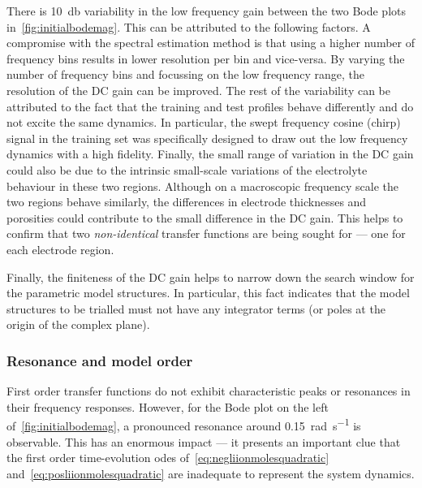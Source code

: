 There is \approx\SI{10}{\decibel} variability in  the low frequency gain between
the two Bode  plots in~\cref{fig:initialbodemag}. This can be  attributed to the
following  factors. A  compromise with  the spectral  estimation method  is that
using a higher number of frequency bins  results in lower resolution per bin and
vice-versa. By  varying the number  of frequency bins  and focussing on  the low
frequency range, the resolution of the DC  gain can be improved. The rest of the
variability can  be attributed to the  fact that the training  and test profiles
behave differently and do not excite the same dynamics. In particular, the swept
frequency cosine (chirp) signal in the training set was specifically designed to
draw out  the low frequency  dynamics with a  high fidelity. Finally,  the small
range of variation in the DC gain could also be due to the intrinsic small-scale
variations of  the electrolyte  behaviour in  these two  regions. Although  on a
macroscopic frequency scale the two regions behave similarly, the differences in
electrode thicknesses and porosities could contribute to the small difference in
the  DC gain.  This  helps  to confirm  that  two \emph{non-identical}  transfer
functions are being sought for --- one for each electrode region.

Finally, the finiteness  of the DC gain  helps to narrow down  the search window
for the parametric model structures. In particular, this fact indicates that the
model structures to be trialled must not  have any integrator terms (or poles at
the origin of the complex plane).

\subsubsection*{Resonance and model order}

First  order  transfer   functions  do  not  exhibit   characteristic  peaks  or
resonances  in  their  frequency  responses.  However,  for  the  Bode  plot  on
the   left   of~\cref{fig:initialbodemag},   a   pronounced   resonance   around
\SI{0.15}{\radian\per\second} is observable. This has  an enormous impact --- it
presents  an important  clue  that the  first  order time-evolution  \glspl{ode}
of~\cref{eq:negliionmolesquadratic}   and~\cref{eq:posliionmolesquadratic}   are
inadequate to represent the system dynamics.

